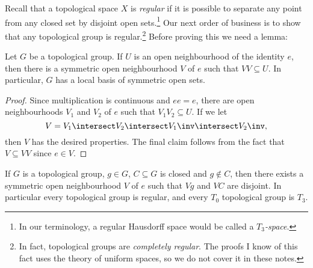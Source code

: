\documentclass[article, a4paper, 11pt, oneside]{memoir}
\numberwithin{equation}{chapter}
\begin{document}

Recall that a topological space $X$ is \emph{regular} if it is possible to separate any point from any closed set by disjoint open sets.\footnote{In our terminology, a regular Hausdorff space would be called a \emph{$T_3$-space}.} Our next order of business is to show that any topological group is regular.\footnote{In fact, topological groups are \emph{completely regular}. The proofs I know of this fact uses the theory of uniform spaces, so we do not cover it in these notes.} Before proving this we need a lemma:

\begin{lemma}
    \label{thm:symmetric_nhood_of_e}
    Let $G$ be a topological group. If $U$ is an open neighbourhood of the identity $e$, then there is a symmetric open neighbourhood $V$ of $e$ such that $VV \subseteq U$. In particular, $G$ has a local basis of symmetric open sets.
\end{lemma}

\begin{proof}
    Since multiplication is continuous and $ee = e$, there are open neighbourhoods $V_1$ and $V_2$ of $e$ such that $V_1 V_2 \subseteq U$. If we let
    \begin{equation*}
        V = V_1 \intersect V_2 \intersect V_1\inv \intersect V_2\inv,
    \end{equation*}
    then $V$ has the desired properties. The final claim follows from the fact that $V \subseteq VV$ since $e \in V$.
\end{proof}


\begin{proposition}
    \label{thm:topological_group_regular}
    If $G$ is a topological group, $g \in G$, $C \subseteq G$ is closed and $g \not\in C$, then there exists a symmetric open neighbourhood $V$ of $e$ such that $Vg$ and $VC$ are disjoint. In particular every topological group is regular, and every $T_0$ topological group is $T_3$.
\end{proposition}
\end{document}

